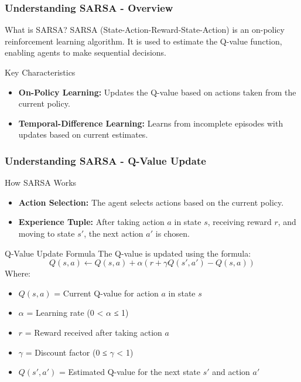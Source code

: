 \documentclass{beamer}
\begin{document}
\begin{frame}[fragile]
    \frametitle{Understanding SARSA - Overview}
    
    \begin{block}{What is SARSA?}
        SARSA (State-Action-Reward-State-Action) is an on-policy reinforcement learning algorithm. It is used to estimate the Q-value function, enabling agents to make sequential decisions.
    \end{block}
    
    \begin{block}{Key Characteristics}
        \begin{itemize}
            \item \textbf{On-Policy Learning:} Updates the Q-value based on actions taken from the current policy.
            \item \textbf{Temporal-Difference Learning:} Learns from incomplete episodes with updates based on current estimates.
        \end{itemize}
    \end{block}
\end{frame}

\begin{frame}[fragile]
    \frametitle{Understanding SARSA - Q-Value Update}
    
    \begin{block}{How SARSA Works}
        \begin{itemize}
            \item \textbf{Action Selection:} The agent selects actions based on the current policy.
            \item \textbf{Experience Tuple:} After taking action \( a \) in state \( s \), receiving reward \( r \), and moving to state \( s' \), the next action \( a' \) is chosen.
        \end{itemize}
    \end{block}
    
    \begin{block}{Q-Value Update Formula}
        The Q-value is updated using the formula:
        \begin{equation}
            Q(s, a) \leftarrow Q(s, a) + \alpha \left( r + \gamma Q(s', a') - Q(s, a) \right)
        \end{equation}
        Where:
        \begin{itemize}
            \item \( Q(s, a) \) = Current Q-value for action \( a \) in state \( s \)
            \item \( \alpha \) = Learning rate (0 < \( \alpha \) ≤ 1)
            \item \( r \) = Reward received after taking action \( a \)
            \item \( \gamma \) = Discount factor (0 ≤ \( \gamma \) < 1)
            \item \( Q(s', a') \) = Estimated Q-value for the next state \( s' \) and action \( a' \)
        \end{itemize}
    \end{block}
\end{frame}
\end{document}
